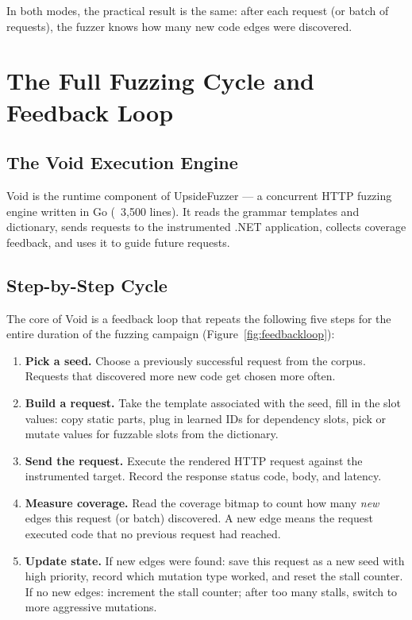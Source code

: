 \documentclass[conference]{IEEEtran}
\begin{document}
In both modes, the practical result is the same: after each request (or batch of requests), the fuzzer knows how many new code edges were discovered.

\section{The Full Fuzzing Cycle and Feedback Loop}
\label{sec:void}

\subsection{The Void Execution Engine}

Void is the runtime component of UpsideFuzzer --- a concurrent HTTP fuzzing engine written in Go (~3,500 lines). It reads the grammar templates and dictionary, sends requests to the instrumented .NET application, collects coverage feedback, and uses it to guide future requests.

\subsection{Step-by-Step Cycle}
\label{sec:feedback_loop}

The core of Void is a feedback loop that repeats the following five steps for the entire duration of the fuzzing campaign (Figure~\ref{fig:feedbackloop}):

\begin{enumerate}
    \item \textbf{Pick a seed.} Choose a previously successful request from the corpus. Requests that discovered more new code get chosen more often.
    \item \textbf{Build a request.} Take the template associated with the seed, fill in the slot values: copy static parts, plug in learned IDs for dependency slots, pick or mutate values for fuzzable slots from the dictionary.
    \item \textbf{Send the request.} Execute the rendered HTTP request against the instrumented target. Record the response status code, body, and latency.
    \item \textbf{Measure coverage.} Read the coverage bitmap to count how many \emph{new} edges this request (or batch) discovered. A new edge means the request executed code that no previous request had reached.
    \item \textbf{Update state.} If new edges were found: save this request as a new seed with high priority, record which mutation type worked, and reset the stall counter. If no new edges: increment the stall counter; after too many stalls, switch to more aggressive mutations.
\end{enumerate}
\end{document}
